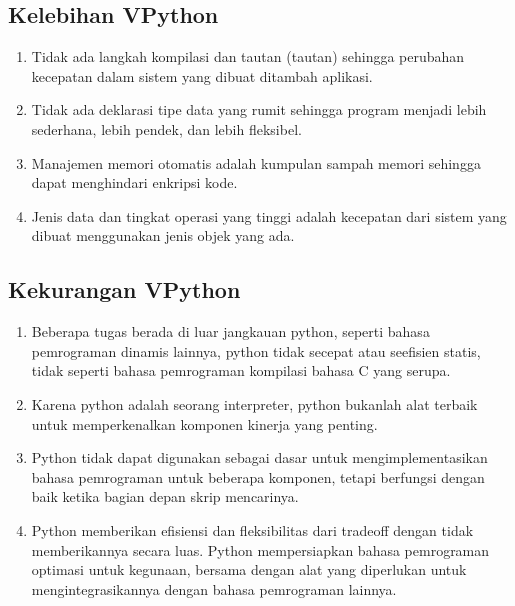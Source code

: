 \subsection{Kelebihan VPython}
		\begin{enumerate}
			\item Tidak ada langkah kompilasi dan tautan (tautan) sehingga perubahan kecepatan dalam sistem yang dibuat ditambah aplikasi.
			\item Tidak ada deklarasi tipe data yang rumit sehingga program menjadi lebih sederhana, lebih pendek, dan lebih fleksibel.
			\item Manajemen memori otomatis adalah kumpulan sampah memori sehingga dapat menghindari enkripsi kode.
			\item Jenis data dan tingkat operasi yang tinggi adalah kecepatan dari sistem yang dibuat menggunakan jenis objek yang ada.
		\end{enumerate}
\subsection{Kekurangan VPython}
		\begin {enumerate}
			\item Beberapa tugas berada di luar jangkauan python, seperti bahasa pemrograman dinamis lainnya, python tidak secepat atau seefisien statis, tidak seperti bahasa pemrograman kompilasi bahasa C yang serupa.
			\item Karena python adalah seorang interpreter, python bukanlah alat terbaik untuk memperkenalkan komponen kinerja yang penting.
			\item Python tidak dapat digunakan sebagai dasar untuk mengimplementasikan bahasa pemrograman untuk beberapa komponen, tetapi berfungsi dengan baik ketika bagian depan skrip mencarinya.
			\item Python memberikan efisiensi dan fleksibilitas dari tradeoff dengan tidak memberikannya secara luas. Python mempersiapkan bahasa pemrograman optimasi untuk kegunaan, bersama dengan alat yang diperlukan untuk mengintegrasikannya dengan bahasa pemrograman lainnya.
		\end{enumerate}
